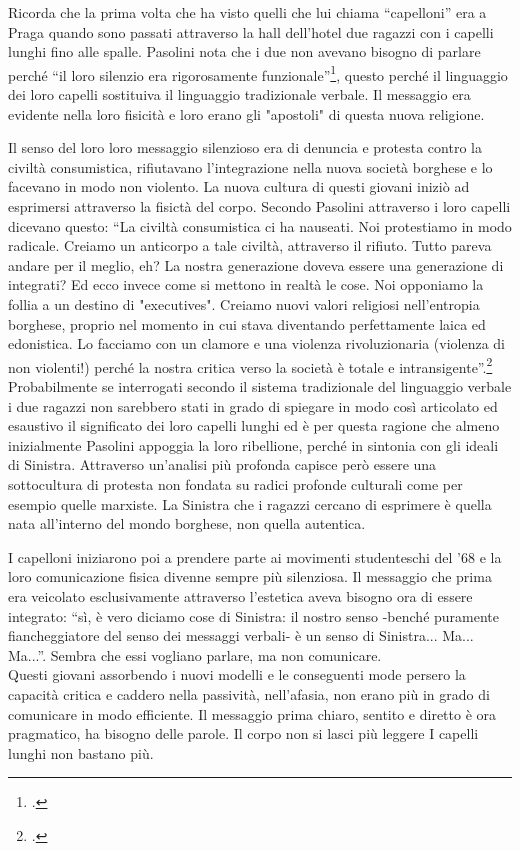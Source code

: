 Ricorda che la prima volta che ha visto quelli che lui chiama \enquote{capelloni} era a Praga quando sono passati attraverso la hall dell'hotel due ragazzi con i capelli lunghi fino alle spalle.
Pasolini nota che i due non avevano bisogno di parlare perché \enquote{il loro silenzio era rigorosamente funzionale}\footcite{Scritti6}, questo perché il linguaggio dei loro capelli sostituiva il linguaggio tradizionale verbale.
Il messaggio era evidente nella loro fisicità e loro erano gli  "apostoli" di questa nuova religione.

Il senso del loro loro messaggio silenzioso era di denuncia e protesta contro la civiltà consumistica, rifiutavano l'integrazione nella nuova società borghese e lo facevano in modo non violento.
La nuova cultura di questi giovani iniziò ad esprimersi attraverso la fisictà del corpo.
Secondo Pasolini attraverso i loro capelli dicevano questo: \enquote{La civiltà consumistica ci ha nauseati. Noi protestiamo in modo radicale. Creiamo un anticorpo a tale civiltà, attraverso il rifiuto. Tutto pareva andare per il meglio, eh? La nostra generazione doveva essere una generazione di integrati? Ed ecco invece come si mettono in realtà le cose. Noi opponiamo la follia a un destino di "executives". Creiamo nuovi valori religiosi nell'entropia borghese, proprio nel momento in cui stava diventando perfettamente laica ed edonistica. Lo facciamo con un clamore e una violenza rivoluzionaria (violenza di non violenti!) perché la nostra critica verso la società è totale e intransigente}.\footcite{Scritti6}
\\Probabilmente se interrogati secondo il sistema tradizionale del linguaggio verbale i due ragazzi non sarebbero stati in grado di spiegare in modo così articolato ed esaustivo il significato dei loro capelli lunghi ed è per questa ragione che almeno inizialmente Pasolini appoggia la loro ribellione, perché in sintonia con gli ideali di Sinistra.
Attraverso un'analisi più profonda capisce però essere una sottocultura di protesta non fondata su radici profonde culturali come per esempio quelle marxiste.
La Sinistra che i ragazzi cercano di esprimere è quella nata all'interno del mondo borghese, non quella autentica.

I capelloni iniziarono poi a prendere parte ai movimenti studenteschi del '68 e la loro comunicazione fisica divenne sempre più silenziosa.
Il messaggio che prima era veicolato esclusivamente attraverso l'estetica aveva bisogno ora di essere integrato: \enquote{sì, è vero diciamo cose di Sinistra: il nostro senso -benché puramente fiancheggiatore del senso dei messaggi verbali- è un senso di Sinistra... Ma... Ma...}.
Sembra che essi vogliano parlare, ma non comunicare.
\\Questi giovani assorbendo i nuovi modelli e le conseguenti mode persero la capacità critica e caddero nella passività, nell'afasia, non erano più in grado di comunicare in modo efficiente.
Il messaggio prima chiaro, sentito e diretto è ora pragmatico, ha bisogno delle parole.
Il corpo non si lasci più leggere
I capelli lunghi non bastano più.

